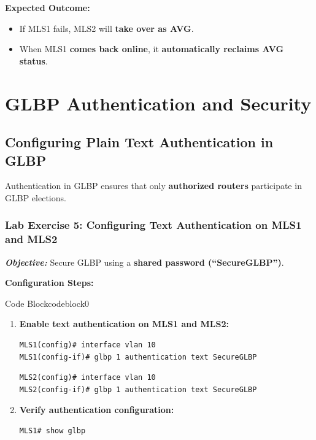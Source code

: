 \documentclass[a4paper]{book}
\begin{document}
\textbf{Expected Outcome:}
\begin{itemize}
\item If MLS1 fails, MLS2 will \textbf{take over as AVG}.
\item When MLS1 \textbf{comes back online}, it \textbf{automatically reclaims AVG status}.
\end{itemize}


\vspace{1em}

\section{GLBP Authentication and Security}

\subsection{Configuring Plain Text Authentication in GLBP}
Authentication in GLBP ensures that only \textbf{authorized routers} participate in GLBP elections.

\subsubsection{Lab Exercise 5: Configuring Text Authentication on MLS1 and MLS2}
\textbf{\textit{Objective:}} Secure GLBP using a \textbf{shared password (``SecureGLBP'')}.
\vspace{1.5em}

\textbf{Configuration Steps:}

\vspace{1.5em}


\begin{ocg}{Code Block}{codeblock}{0}

\vspace{0.5cm}

\begin{enumerate}
\item \textbf{Enable text authentication on MLS1 and MLS2:}
\begin{lstlisting}
MLS1(config)# interface vlan 10
MLS1(config-if)# glbp 1 authentication text SecureGLBP
\end{lstlisting}
\begin{lstlisting}
MLS2(config)# interface vlan 10
MLS2(config-if)# glbp 1 authentication text SecureGLBP
\end{lstlisting}

\item \textbf{Verify authentication configuration:}
\begin{lstlisting}
MLS1# show glbp
\end{lstlisting}
\end{enumerate}
\end{ocg}
\end{document}
